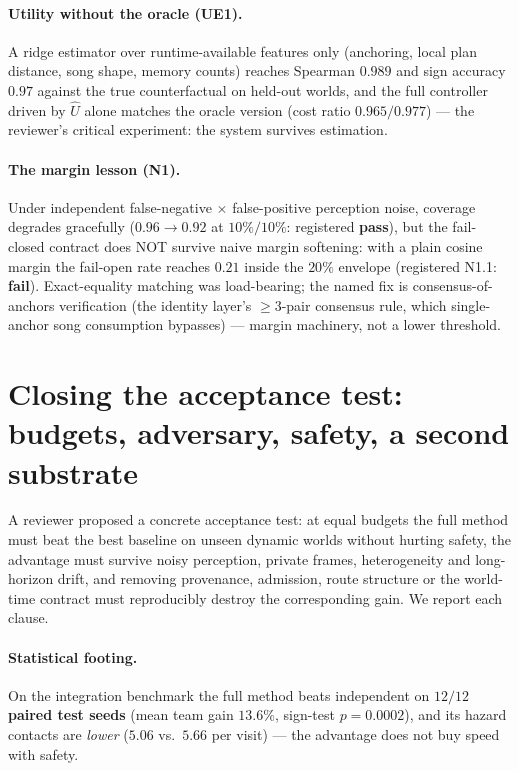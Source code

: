 \documentclass{article}
\begin{document}
\paragraph{Utility without the oracle (UE1).} A ridge estimator over
runtime-available features only (anchoring, local plan distance, song
shape, memory counts) reaches Spearman $0.989$ and sign accuracy
$0.97$ against the true counterfactual on held-out worlds, and the
full controller driven by $\widehat U$ alone matches the oracle
version (cost ratio $0.965/0.977$) --- the reviewer's critical
experiment: the system survives estimation.

\paragraph{The margin lesson (N1).} Under independent false-negative
$\times$ false-positive perception noise, coverage degrades
gracefully ($0.96 \to 0.92$ at $10\%/10\%$: registered
\textbf{pass}), but the fail-closed contract does NOT survive naive
margin softening: with a plain cosine margin the fail-open rate
reaches $0.21$ inside the $20\%$ envelope (registered N1.1:
\textbf{fail}). Exact-equality matching was load-bearing; the named
fix is consensus-of-anchors verification (the identity layer's
$\ge 3$-pair consensus rule, which single-anchor song consumption
bypasses) --- margin machinery, not a lower threshold.


\section{Closing the acceptance test: budgets, adversary, safety, a
second substrate}
\label{sec:acceptance}

A reviewer proposed a concrete acceptance test: at equal budgets the
full method must beat the best baseline on unseen dynamic worlds
without hurting safety, the advantage must survive noisy perception,
private frames, heterogeneity and long-horizon drift, and removing
provenance, admission, route structure or the world-time contract
must reproducibly destroy the corresponding gain. We report each
clause.

\paragraph{Statistical footing.} On the integration benchmark the
full method beats independent on \textbf{$12/12$ paired test seeds}
(mean team gain $13.6\%$, sign-test $p = 0.0002$), and its hazard
contacts are \emph{lower} ($5.06$ vs.\ $5.66$ per visit) --- the
advantage does not buy speed with safety.
\end{document}
